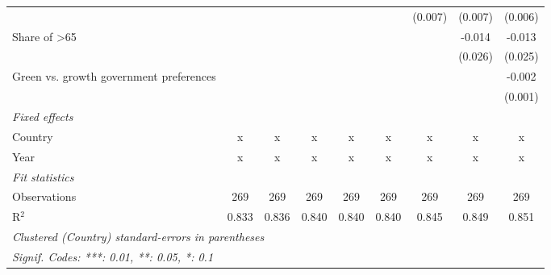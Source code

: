 \begin{table}[htbp]
\begin{tabular}{lcccccccc}
                                               &         &              &         &         &         & (0.007) & (0.007) & (0.006)\\   
      Share of >65                             &         &              &         &         &         &         & -0.014  & -0.013\\   
                                               &         &              &         &         &         &         & (0.026) & (0.025)\\   
      Green vs. growth government preferences  &         &              &         &         &         &         &         & -0.002\\   
                                               &         &              &         &         &         &         &         & (0.001)\\   
      \emph{Fixed effects}\\
      Country                                  & x       & x            & x       & x       & x       & x       & x       & x\\  
      Year                                     & x       & x            & x       & x       & x       & x       & x       & x\\  
      \midrule \emph{Fit statistics}\\
      Observations                             & 269     & 269          & 269     & 269     & 269     & 269     & 269     & 269\\  
      R$^2$                                    & 0.833   & 0.836        & 0.840   & 0.840   & 0.840   & 0.845   & 0.849   & 0.851\\  
      \midrule
      \multicolumn{9}{l}{\emph{Clustered (Country) standard-errors in parentheses}}\\
      \multicolumn{9}{l}{\emph{Signif. Codes: ***: 0.01, **: 0.05, *: 0.1}}\\
   \end{tabular}
\end{table}


